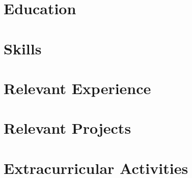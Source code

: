 \documentclass[letterpaper,8pt]{article}
\begin{document}


\vspace{-4mm} %
% 

\vspace{-3mm} %
\section{Education}


\vspace{-4mm} %

\section{Skills}
\vspace{-0.5mm} %


\vspace{-6mm} %
\section{Relevant Experience}
\resumeSubHeadingListStart
      
      

  \resumeSubHeadingListEnd

  \vspace{-4.1mm} %

\section{Relevant Projects}
    \resumeSubHeadingListStart

    
    
    

    \resumeSubHeadingListEnd
  \vspace{-5mm} %

\section{Extracurricular Activities }

    
\end{document}
